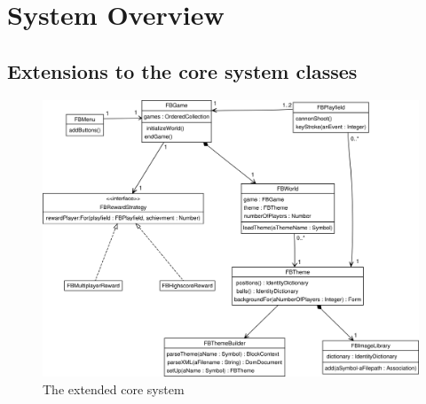 \section{System Overview}
\subsection{Extensions to the core system classes}
%
\begin{figure}[bt]
  \begin{center}
    \includegraphics[width=\linewidth]{images/systemcore.png}
  \end{center}
  \caption{The extended core system}
  \label{fig:systemcore}
\end{figure}
%
